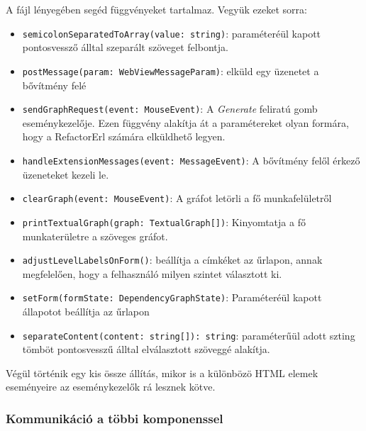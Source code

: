 A fájl lényegében segéd függvényeket tartalmaz. Vegyük ezeket sorra:

\begin{itemize}
    \item \lstinline{semicolonSeparatedToArray(value: string)}: paraméteréül kapott pontosvessző álltal szeparált szöveget felbontja.
    
    \item \lstinline{postMessage(param: WebViewMessageParam)}: elküld egy üzenetet a bővítmény felé
    
    \item \lstinline{sendGraphRequest(event: MouseEvent)}: A \textit{Generate} feliratú gomb eseménykezelője. Ezen függvény alakítja át a paramétereket olyan formára, hogy a RefactorErl számára elküldhető legyen.
    
    \item \lstinline{handleExtensionMessages(event: MessageEvent)}: A bővítmény felől érkező üzeneteket kezeli le.
    
    \item \lstinline{clearGraph(event: MouseEvent)}: A gráfot letörli a fő munkafelületről
    
    \item \lstinline{printTextualGraph(graph: TextualGraph[])}: Kinyomtatja a fő munkaterületre a szöveges gráfot.
    
    \item \lstinline{adjustLevelLabelsOnForm()}: beállítja a címkéket az űrlapon, annak megfelelően, hogy a felhasználó milyen szintet választott ki.
    
    \item \lstinline{setForm(formState: DependencyGraphState)}: Paraméteréül kapott állapotot beállítja az űrlapon
    
    \item \lstinline{separateContent(content: string[]): string}: paraméterűül adott szting tömböt pontosvesszű álltal elválasztott szöveggé alakítja.
    
\end{itemize}


Végül történik egy kis össze állítás, mikor is a különbözö HTML elemek eseményeire az eseménykezelők rá lesznek kötve.


\subsubsection{Kommunikáció a többi komponenssel}

